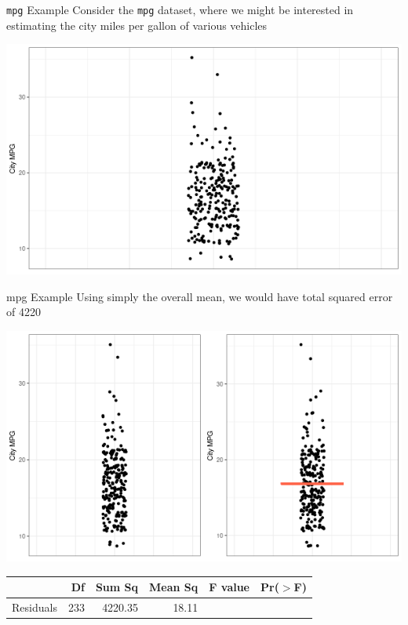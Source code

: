\documentclass{beamer}
\begin{document}
\begin{frame}{\texttt{mpg} Example}
Consider the \texttt{mpg} dataset, where we might be interested in estimating the city miles per gallon of various vehicles

\begin{center}
\includegraphics[scale=0.5]{ctympg0.png}
\end{center}

\end{frame}

\begin{frame}{mpg Example}
\small
Using simply the overall mean, we would have total squared error of 4220

\begin{center}
\includegraphics[scale=0.45]{ctympg1.png}
\end{center}
\begin{table}[ht]
\centering
\begin{tabular}{lrrrrr}
  \hline
 & Df & Sum Sq & Mean Sq & F value & Pr($>$F) \\ 
  \hline
Residuals   & 233 & 4220.35 & 18.11 &  &  \\ 
   \hline
\end{tabular}
\end{table}
\end{frame}
\end{document}
